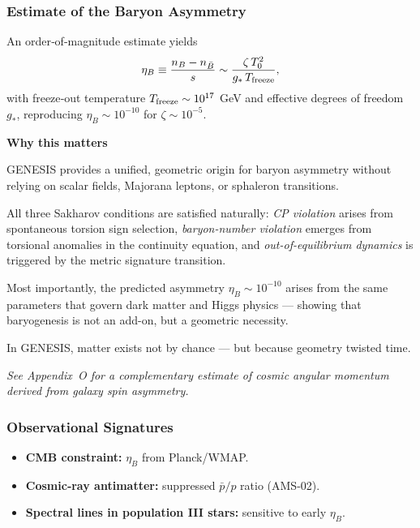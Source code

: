 \documentclass{article}
\begin{document}
\subsubsection{ Estimate of the Baryon Asymmetry}
An order‐of‐magnitude estimate yields
\[
  \eta_B \equiv \frac{n_B - n_{\bar B}}{s}
  \sim \frac{\zeta\,T_0^2}{g_*\,T_{\rm freeze}},
\]
with freeze‐out temperature \(T_{\rm freeze}\sim10^{17}\) GeV and 
effective degrees of freedom \(g_*\), reproducing \(\eta_B\sim10^{-10}\)
for \(\zeta\sim10^{-5}\).



\begin{tcolorbox}[
  colback=white,
  colframe=black!30,
  boxrule=0.3pt,
  arc=2pt,
  left=6pt,
  right=6pt,
  top=4pt,
  bottom=4pt,
  enhanced
]
\textbf{Why this matters} \\
\vspace{2pt}
\begin{minipage}{0.92\linewidth}

GENESIS provides a unified, geometric origin for baryon asymmetry without relying on scalar fields, Majorana leptons, or sphaleron transitions. 

All three Sakharov conditions are satisfied naturally: \emph{CP violation} arises from spontaneous torsion sign selection, \emph{baryon-number violation} emerges from torsional anomalies in the continuity equation, and \emph{out-of-equilibrium dynamics} is triggered by the metric signature transition.

Most importantly, the predicted asymmetry $\eta_B \sim 10^{-10}$ arises from the same parameters that govern dark matter and Higgs physics — showing that baryogenesis is not an add-on, but a geometric necessity.

In GENESIS, matter exists not by chance — but because geometry twisted time.
\end{minipage}
\end{tcolorbox}

\vspace{0.5em}
\noindent
\textit{See Appendix~O for a complementary estimate of cosmic angular momentum derived from galaxy spin asymmetry.}





\subsubsection{ Observational Signatures}
\begin{itemize}
  \item \textbf{CMB constraint:} \(\eta_B\) from Planck/WMAP.  
  \item \textbf{Cosmic‐ray antimatter:} suppressed \(\bar p/p\) ratio (AMS-02).  
  \item \textbf{Spectral lines in population III stars:} sensitive to early \(\eta_B\).
\end{itemize}
\end{document}
